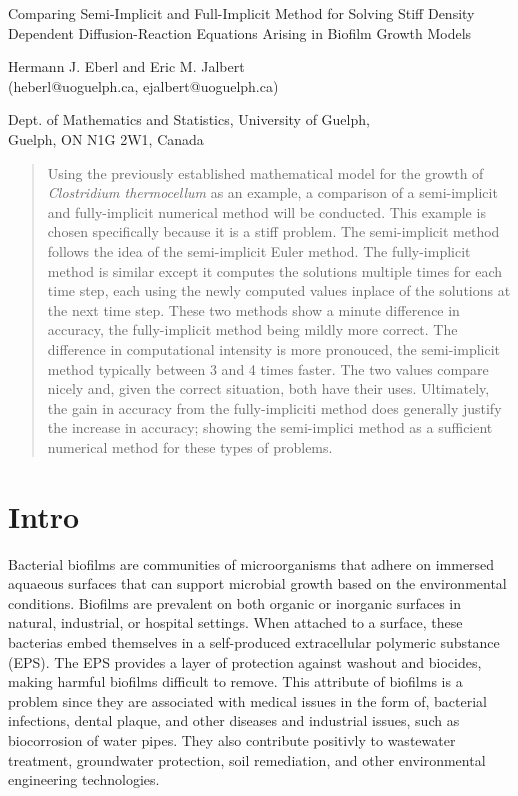 \documentclass{llncs}
\begin{document}
\begin{center}
{\Large{Comparing Semi-Implicit and Full-Implicit Method for Solving Stiff Density Dependent Diffusion-Reaction Equations Arising in Biofilm Growth Models}}

\vspace{10pt}

{{Hermann J. Eberl and Eric M. Jalbert\\
  (heberl@uoguelph.ca, ejalbert@uoguelph.ca)\\}}
  
  {{Dept. of Mathematics and Statistics, University of Guelph,\\ 
  Guelph, ON N1G 2W1, Canada}}
\end{center}

\begin{abstract}
  Using the previously established mathematical model for the growth of \textit{Clostridium thermocellum} as an example, a comparison of a semi-implicit and fully-implicit numerical method will be conducted.
  This example is chosen specifically because it is a stiff problem.
  The semi-implicit method follows the idea of the semi-implicit Euler method.
  The fully-implicit method is similar except it computes the solutions multiple times for each time step, each using the newly computed values inplace of the solutions at the next time step.
  These two methods show a minute difference in accuracy, the fully-implicit method being mildly more correct.
  The difference in computational intensity is more pronouced, the semi-implicit method typically between 3 and 4 times faster. 
  The two values compare nicely and, given the correct situation, both have their uses.
  Ultimately, the gain in accuracy from the fully-impliciti method does generally justify the increase in accuracy; showing the semi-implici method as a sufficient numerical method for these types of problems.
\end{abstract}

\section{Intro}
  Bacterial biofilms are communities of microorganisms that adhere on immersed aquaeous surfaces that can support microbial growth based on the environmental conditions. 
  Biofilms are prevalent on both organic or inorganic surfaces in natural, industrial, or hospital settings.
  When attached to a surface, these bacterias embed themselves in a self-produced extracellular polymeric substance (EPS).
  The EPS provides a layer of protection against washout and biocides, making harmful biofilms difficult to remove.
  This attribute of biofilms is a problem since they are associated with medical issues in the form of, bacterial infections, dental plaque, and other diseases and industrial issues, such as biocorrosion of water pipes. 
  They also contribute positivly to wastewater treatment, groundwater protection, soil remediation, and other environmental engineering technologies.
  
\end{document}
